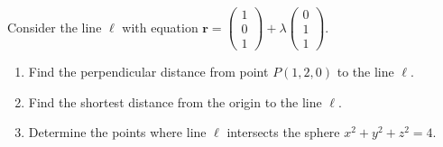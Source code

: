 \begin{problem}
Consider the line $\ell$ with equation $\mathbf{r} = \begin{pmatrix} 1 \\ 0 \\ 1 \end{pmatrix} + \lambda \begin{pmatrix} 0 \\ 1 \\ 1 \end{pmatrix}$.
\begin{enumerate}[label=(\roman*)]
    \item Find the perpendicular distance from point $P(1, 2, 0)$ to the line $\ell$.
    \item Find the shortest distance from the origin to the line $\ell$.
    \item Determine the points where line $\ell$ intersects the sphere $x^2 + y^2 + z^2 = 4$.
\end{enumerate}
\end{problem}

